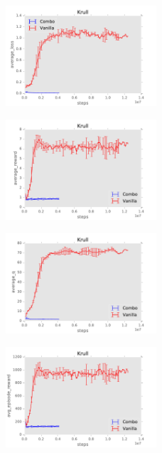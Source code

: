 \documentclass{sig-alternate}
\begin{document}
\begin{figure}
    \centering
    \includegraphics[width=0.5\textwidth]{../results/Krull/Comparisons/Combo/Combo-baseline-average_loss.pdf}
\end{figure}


\begin{figure}
    \centering
    \includegraphics[width=0.5\textwidth]{../results/Krull/Comparisons/Combo/Combo-baseline-average_reward.pdf}
\end{figure}

\begin{figure}
    \centering
    \includegraphics[width=0.5\textwidth]{../results/Krull/Comparisons/Combo/Combo-baseline-average_q.pdf}
\end{figure}

\begin{figure}
    \centering
    \includegraphics[width=0.5\textwidth]{../results/Krull/Comparisons/Combo/Combo-baseline-avg_episode_reward.pdf}
\end{figure}
\end{document}
